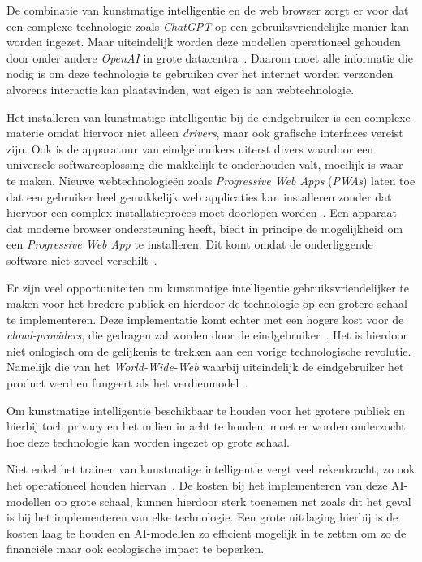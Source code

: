 \bigbreak{}

De combinatie van kunstmatige intelligentie en de web browser zorgt er voor dat een complexe technologie zoals \textit{ChatGPT} op een gebruiksvriendelijke manier kan worden ingezet. Maar uiteindelijk worden deze modellen operationeel gehouden door onder andere \textit{OpenAI} in grote datacentra~\autocite{Warren2023}. Daarom moet alle informatie die nodig is om deze technologie te gebruiken over het internet worden verzonden alvorens interactie kan plaatsvinden, wat eigen is aan webtechnologie.

\bigbreak{}

Het installeren van kunstmatige intelligentie bij de eindgebruiker is een complexe materie omdat hiervoor niet alleen \textit{drivers}, maar ook grafische interfaces vereist zijn. Ook is de apparatuur van eindgebruikers uiterst divers waardoor een universele softwareoplossing die makkelijk te onderhouden valt, moeilijk is waar te maken. Nieuwe webtechnologieën zoals \textit{Progressive Web Apps} (\textit{PWAs}) laten toe dat een gebruiker heel gemakkelijk web applicaties kan installeren zonder dat hiervoor een complex installatieproces moet doorlopen worden~\autocite{Pekala2023}. Een apparaat dat moderne browser ondersteuning heeft, biedt in principe de mogelijkheid om een \textit{Progressive Web App} te installeren. Dit komt omdat de onderliggende software niet zoveel verschilt~\autocite{Todavchich2019}.

\bigbreak{}

Er zijn veel opportuniteiten om kunstmatige intelligentie gebruiksvriendelijker te maken voor het bredere publiek en hierdoor de technologie op een grotere schaal te implementeren. Deze implementatie komt echter met een hogere kost voor de \textit{cloud-providers}, die gedragen zal worden door de eind\-ge\-brui\-ker~\autocite{Khan2024}. Het is hierdoor niet onlogisch om de gelijkenis te trekken aan een vorige technologische revolutie. Namelijk die van het \textit{World-Wide-Web} waarbij uiteindelijk de eind\-ge\-brui\-ker het product werd en fungeert als het verdienmodel~\autocite{quoteresearch2017, OKO2019}.

\bigbreak{}

Om kunstmatige intelligentie beschikbaar te houden voor het grotere publiek en hierbij toch privacy en het milieu in acht te houden, moet er worden onderzocht hoe deze technologie kan worden ingezet op grote schaal.

\bigbreak{}

Niet enkel het trainen van kunstmatige intelligentie vergt veel rekenkracht, zo ook het operationeel houden hiervan~\autocite{Patel2023}. De kosten bij het implementeren van deze AI-modellen op grote schaal, kunnen hierdoor sterk toenemen net zoals dit het geval is bij het implementeren van elke technologie. Een grote uitdaging hierbij is de kosten laag te houden en AI-modellen zo efficient mogelijk in te zetten om zo de financiële maar ook ecologische impact te beperken.

